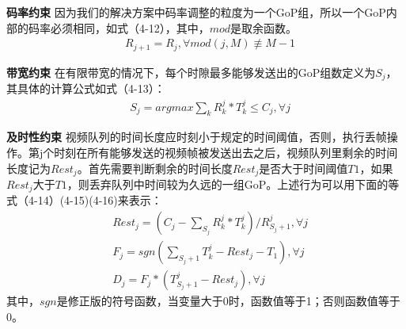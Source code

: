 \textbf{码率约束} 因为我们的解决方案中码率调整的粒度为一个GoP组，所以一个GoP内部的码率必须相同，如式（4-12），其中，$mod$是取余函数。
\begin{align}
  & R_{j+1}=R_j, \forall mod(j,M)\not\equiv M-1
\end{align}

\textbf{带宽约束} 在有限带宽的情况下，每个时隙最多能够发送出的GoP组数定义为$S_j$，其具体的计算公式如式（4-13）：
\begin{align}
  & S_j = argmax{\sum_k R_k^j*T_k^j \leq C_j}, \forall j
\end{align}

\textbf{及时性约束} 视频队列的时间长度应时刻小于规定的时间阈值，否则，执行丢帧操作。第j个时刻在所有能够发送的视频帧被发送出去之后，视频队列里剩余的时间长度记为$Rest_j$。首先需要判断剩余的时间长度$Rest_j$是否大于时间阈值$T1$，如果$Rest_j$大于$T1$，则丢弃队列中时间较为久远的一组GoP。上述行为可以用下面的等式（4-14）(4-15)(4-16)来表示：
\begin{align}
  & Rest_j = (C_j- \sum_{S_j} R_k^j*T_k^j)/R_{S_j+1}^j, \forall j \\
  & F_j = sgn(\sum_{S_j+1} T_k^j - Rest_j-T_1), \forall j \\
  & D_j = F_j*(T_{S_j+1}^j-Rest_j), \forall j
\end{align}
其中，$sgn$是修正版的符号函数，当变量大于0时，函数值等于1；否则函数值等于0。

